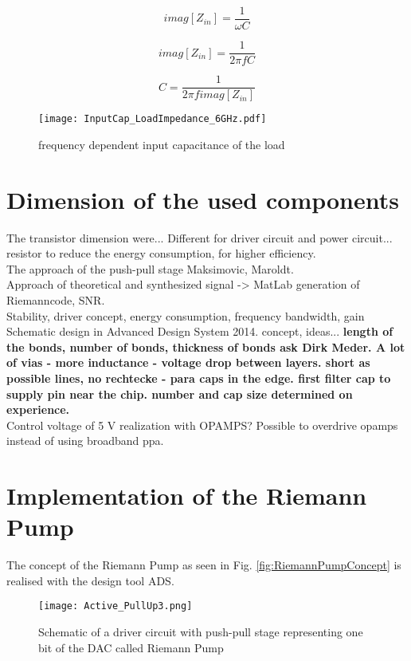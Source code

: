 \begin{equation}
imag[Z_{in}] = \frac{1}{\omega C}
\end{equation}

\begin{equation}
imag[Z_{in}] = \frac{1}{2 \pi f C}
\end{equation}

\begin{equation}
C = \frac{1}{2 \pi f imag[Z_{in}]}
\end{equation}

 \begin{figure}[ht]
	\centering
  \texttt{[image: InputCap\_LoadImpedance\_6GHz.pdf]}
	\caption{frequency dependent input capacitance of the load}
	\label{fig:smith_load_impedance}
\end{figure}
\section{Dimension of the used components}
The transistor dimension were... Different for driver circuit and power circuit... resistor to reduce the energy  consumption, for higher efficiency. \\ The
approach of the push-pull stage Maksimovic, Maroldt.\\
Approach of theoretical and synthesized signal -> MatLab generation of Riemanncode, SNR.\\ Stability, driver concept, energy consumption, frequency bandwidth, gain
Schematic design in Advanced Design System 2014. concept, ideas... 
\textbf{length of the bonds, number of bonds, thickness of bonds ask Dirk Meder. A lot of vias - more inductance - voltage drop between layers. short as possible lines, no rechtecke - para caps in the edge. first filter cap to supply pin near the chip. number and cap size determined on experience. }\\
Control voltage of 5 V realization with OPAMPS? Possible to overdrive opamps instead of using broadband ppa. 

\section{Implementation of the Riemann Pump}
The concept of the Riemann Pump as seen in Fig. \ref{fig:RiemannPumpConcept} is realised with the design tool ADS.

\begin{figure}[ht]
	\centering
  \texttt{[image: Active\_PullUp3.png]}
	\caption{Schematic of a driver circuit with push-pull stage representing one bit of the DAC called Riemann Pump}
	\label{RiemannPump}
\end{figure}